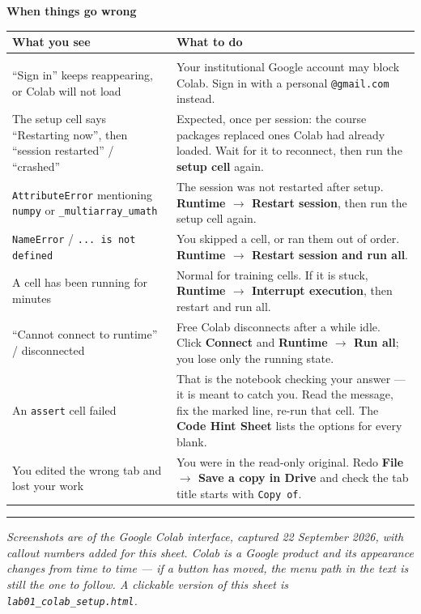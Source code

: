 \documentclass[11pt]{article}
\begin{document}
\noindent\begin{minipage}{\textwidth}
\textbf{\large When things go wrong}

\vspace{2pt}
\begin{tabular}{@{}p{}p{}@{}}
\textbf{What you see} & \textbf{What to do} \\[2pt]
\hline\\[-6pt]
``Sign in'' keeps reappearing, or Colab will not load &
  Your institutional Google account may block Colab. Sign in with a personal
  \texttt{@gmail.com} instead. \\[3pt]
The setup cell says ``Restarting now'', then ``session restarted'' / ``crashed'' &
  Expected, once per session: the course packages replaced ones Colab had
  already loaded. Wait for it to reconnect, then run the \textbf{setup cell} again. \\[3pt]
\texttt{AttributeError} mentioning \texttt{numpy} or \texttt{\_multiarray\_umath} &
  The session was not restarted after setup. \textbf{Runtime $\rightarrow$ Restart session},
  then run the setup cell again. \\[3pt]
\texttt{NameError} / \texttt{... is not defined} &
  You skipped a cell, or ran them out of order. \textbf{Runtime $\rightarrow$ Restart session and run all}. \\[3pt]
A cell has been running for minutes &
  Normal for training cells. If it is stuck, \textbf{Runtime $\rightarrow$ Interrupt execution}, then restart and run all. \\[3pt]
``Cannot connect to runtime'' / disconnected &
  Free Colab disconnects after a while idle. Click \textbf{Connect} and
  \textbf{Runtime $\rightarrow$ Run all}; you lose only the running state. \\[3pt]
An \texttt{assert} cell failed &
  That is the notebook checking your answer --- it is meant to catch you.
  Read the message, fix the marked line, re-run that cell. The
  \textbf{Code Hint Sheet} lists the options for every blank. \\[3pt]
You edited the wrong tab and lost your work &
  You were in the read-only original. Redo \textbf{File $\rightarrow$ Save a copy in Drive}
  and check the tab title starts with \texttt{Copy of}. \\
\end{tabular}
\end{minipage}

\vspace{6pt}\hrule\vspace{3pt}
{\scriptsize\itshape
Screenshots are of the Google Colab interface, captured 22 September 2026, with
callout numbers added for this sheet. Colab is a Google product and its
appearance changes from time to time --- if a button has moved, the menu path in
the text is still the one to follow. A clickable version of this sheet is
\texttt{lab01\_colab\_setup.html}.}
\end{document}
